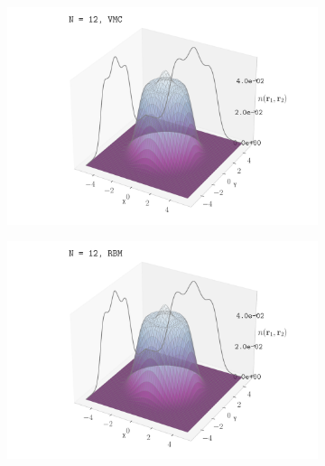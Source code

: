 \begin{figure}[H]
    \centering
    \begin{subfigure}[t]{0.32\textwidth}
        \centering
        \includegraphics[width=\textwidth]{Chapters/Results/dots/density_profile_3d_N12_nqs_VMC_1.0.pdf}
        \label{fig:sub4}
    \end{subfigure}
    \begin{subfigure}[t]{0.32\textwidth}
        \centering
        \includegraphics[width=\textwidth]{Chapters/Results/dots/density_profile_3d_N12_nqs_RBM_1.0.pdf}
        \label{fig:sub5}
    \end{subfigure}
    \begin{subfigure}[t]{0.32\textwidth}
        \centering

\end{subfigure}
\end{figure}
